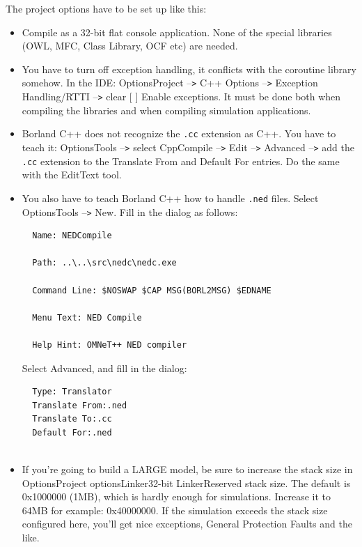 The project options have to be set up like this:
\begin{itemize}
\item{Compile as a 32-bit flat console application. None of the
    special libraries (OWL, MFC, Class Library, OCF etc) are needed.}
\item{You have to turn off exception handling, it conflicts with the coroutine
    library somehow. In the IDE:
    Options{\textbar}Project --\texttt{>} C++ Options --\texttt{>}
    Exception Handling/RTTI --\texttt{>} clear [ ] Enable exceptions.
    It must be done both when compiling the libraries and when
    compiling simulation applications.}
\item{Borland C++ does not recognize the \texttt{.cc} extension as
    C++. You have to teach it: Options{\textbar}Tools --\texttt{>}
    select CppCompile --\texttt{>} Edit --\texttt{>} Advanced
    --\texttt{>} add the \texttt{.cc} extension to the Translate From
    and Default For entries. Do the same with the EditText tool.}
\item{You also have to teach Borland C++ how to handle \texttt{.ned}
    files.  Select Options{\textbar}Tools --\texttt{>} New. Fill in
    the dialog as follows:
\begin{Verbatim}
  Name: NEDCompile

  Path: ..\..\src\nedc\nedc.exe

  Command Line: $NOSWAP $CAP MSG(BORL2MSG) $EDNAME

  Menu Text: NED Compile

  Help Hint: OMNeT++ NED compiler
\end{Verbatim}
  Select Advanced, and fill in the dialog:
\begin{Verbatim}
  Type: Translator
  Translate From:.ned
  Translate To:.cc
  Default For:.ned
  
\end{Verbatim}
}

\sloppy
\item{If you're going to build a LARGE model, be sure to
  increase the stack size in
  Options{\textbar}Project options{\textbar}Linker{\textbar}32-bit
  Linker{\textbar}Reserved stack size. The default is 0x1000000 (1MB),
  which is hardly enough for {\opp} simulations. Increase it to 64MB
  for example: 0x40000000. If the simulation exceeds the stack size
  configured here, you'll get nice exceptions, General Protection
  Faults and the like.}
\end{itemize}


